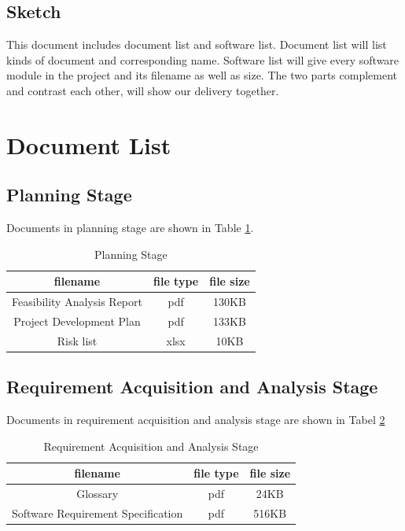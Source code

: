 \documentclass[10pt]{article}
\begin{document}
\subsection{Sketch}
This document includes document list and software list. Document list will list kinds of document and corresponding name. Software list will give every software module in the project and its filename as well as size. The two parts complement and contrast each other, will show our delivery together.

\section{Document List}
\subsection{Planning Stage}
Documents in planning stage are shown in Table \ref{Planning Stage}.
\begin{table}[htb]
	\centering 

	\begin{tabular}{c|c|c} 
		\hline 
		filename&file type&file size\\
		\hline  
Feasibility Analysis Report&pdf&130KB\\
\hline
Project Development Plan&pdf&133KB\\
\hline
Risk list&xlsx&10KB\\
\hline
\end{tabular}

\caption{Planning Stage}
\label{Planning Stage}
\end{table}

\subsection{Requirement Acquisition and Analysis Stage}
Documents in requirement acquisition and analysis stage are shown in Tabel \ref{Requirement Acquisition and Analysis Stage}
\begin{table}[htb]
	\centering

	\begin{tabular}{c|c|c} 
		\hline 
		filename&file type&file size\\
		\hline  
Glossary&pdf&24KB\\
\hline
Software Requirement Specification&pdf&516KB\\
\hline
\end{tabular} 
\caption{Requirement Acquisition and Analysis Stage}
\label{Requirement Acquisition and Analysis Stage}
\end{table}
\end{document}

